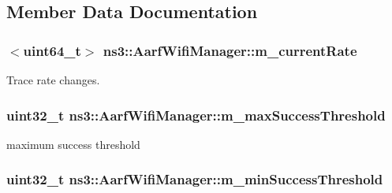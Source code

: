\subsection{Member Data Documentation}
\subsubsection[{\texorpdfstring{m\+\_\+current\+Rate}{m_currentRate}}]{$<$uint64\+\_\+t$>$ ns3\+::\+Aarf\+Wifi\+Manager\+::m\+\_\+current\+Rate\hspace{0.3cm}{\ttfamily [private]}}\hypertarget{classns3_1_1AarfWifiManager_aaf593968aa9acd2292b0be08930d8c9f}{}\label{classns3_1_1AarfWifiManager_aaf593968aa9acd2292b0be08930d8c9f}


Trace rate changes. 

\subsubsection[{\texorpdfstring{m\+\_\+max\+Success\+Threshold}{m_maxSuccessThreshold}}]{\setlength{\rightskip}{0pt plus 5cm}uint32\+\_\+t ns3\+::\+Aarf\+Wifi\+Manager\+::m\+\_\+max\+Success\+Threshold\hspace{0.3cm}{\ttfamily [private]}}\hypertarget{classns3_1_1AarfWifiManager_a66100481b6ec3a506ef0fbea3de7cb7d}{}\label{classns3_1_1AarfWifiManager_a66100481b6ec3a506ef0fbea3de7cb7d}


maximum success threshold 

\subsubsection[{\texorpdfstring{m\+\_\+min\+Success\+Threshold}{m_minSuccessThreshold}}]{\setlength{\rightskip}{0pt plus 5cm}uint32\+\_\+t ns3\+::\+Aarf\+Wifi\+Manager\+::m\+\_\+min\+Success\+Threshold\hspace{0.3cm}{\ttfamily [private]}}\hypertarget{classns3_1_1AarfWifiManager_a08955e01de046ef922862c4747ecc855}{}\label{classns3_1_1AarfWifiManager_a08955e01de046ef922862c4747ecc855}


